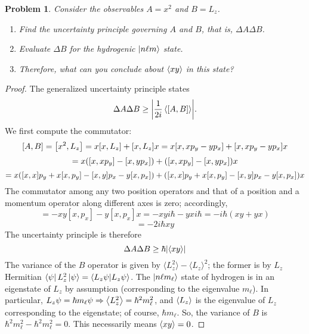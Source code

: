 \documentclass{article}
\newtheorem{plm}{Problem}
\begin{document}
\begin{plm}
  Consider the observables $A = x^{2}$ and $B = L_{z}$.
  \begin{enumerate}
  \item Find the uncertainty principle governing $A$ and $B$, that is, $\Delta A\Delta B$.
  \item Evaluate $\Delta B$ for the hydrogenic $\ket{n\ell m}$ state.
  \item Therefore, what can you conclude about $\expval{xy}$ in this state?
  \end{enumerate}
\end{plm}

\begin{proof}
  The generalized uncertainty principle states
  \[
    \Delta A\Delta B \geq \qty|\frac{1}{2i}\expval{\qty[{A}, {B}]}|.
  \]
  We first compute the commutator:
  \[
    \qty[A, B] = \qty[x^{2}, L_{z}] = x\qty[x, L_{z}] + \qty[x, L_{z}]x
    = x\qty[x, xp_{y} - yp_{x}] + \qty[x, xp_{y} - yp_{x}]x
  \]
  \[
    = x\qty([x, xp_{y}] - [x, yp_{x}]) + \qty([x, xp_{y}] - [x, yp_{x}])x
  \]
  \[
    = x\qty([x, x]p_{y} + x[x, p_{y}] - [x, y]p_{x} - y[x, p_{x}]) + \qty([x, x]p_{y} + x[x, p_{y}] - [x, y]p_{x} - y[x, p_{x}])x
  \]
  The commutator among any two position operators and that of a position and a momentum operator along different axes is zero; accordingly,
  \[
    = -xy[x, p_{x}] - y[x, p_{x}]x
    = -xyi\hbar - yxi\hbar
    = -i\hbar(xy + yx)
  \]
  \[
    = -2i\hbar xy
  \]
  The uncertainty principle is therefore
  \[
    \Delta A \Delta B \geq \hbar\qty|\expval{xy}|
  \]
  The variance of the $B$ operator is given by $\langle L_{z}^{2} \rangle - \langle L_{z} \rangle^{2}$;
  the former is by $L_{z}$ Hermitian $\bra{\psi}L_{z}^{2}\ket{\psi} = \bra{L_{z}\psi}\ket{L_{z}\psi}$.
  The $\ket{n\ell m_{\ell}}$ state of hydrogen is in an eigenstate of $L_{z}$ by assumption (corresponding to the eigenvalue $m_{\ell}$).
  In particular, $L_{z} \psi = \hbar m_{\ell}\psi \Rightarrow \expval{L_{z}^{2}} = \hbar^{2}m_{\ell}^{2}$,
  and $\expval{L_{z}}$ is the eigenvalue of $L_{z}$ corresponding to the eigenstate; of course, $\hbar m_{\ell}$.
  So, the variance of $B$ is $\hbar^{2}m_{\ell}^{2} - \hbar^{2}m_{\ell}^{2} = 0$.
  This necessarily means $\expval{xy} = 0$.
\end{proof}
\end{document}
